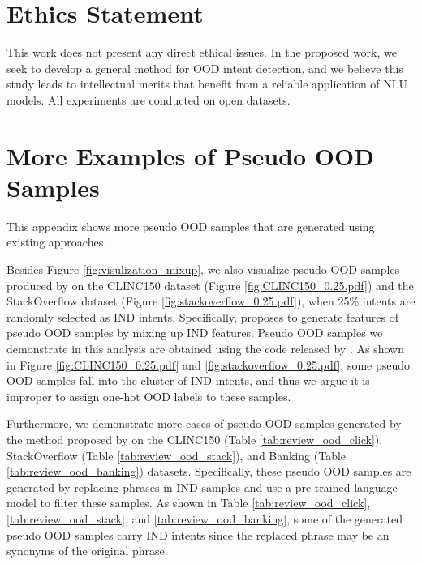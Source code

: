 \documentclass[11pt]{article}
\begin{document}
\section*{Ethics Statement}
This work does not present any direct ethical issues. In the proposed work, we seek to develop a general method for OOD intent detection, and we believe this study leads to intellectual merits that benefit from a reliable application of NLU models.  All experiments are conducted on open datasets.




\appendix

\section{More Examples of Pseudo OOD Samples}\label{append:ood_example}
This appendix shows more pseudo OOD samples that are generated using existing approaches.

Besides Figure \ref{fig:visulization_mixup}, we also visualize pseudo OOD samples produced by \citet{zhan2021out} on the CLINC150 \citep{larson2019evaluation} dataset (Figure \ref{fig:CLINC150_0.25.pdf}) and the StackOverflow \citep{xu2015short} dataset (Figure \ref{fig:stackoverflow_0.25.pdf}), when 25\% intents are randomly selected as IND intents. Specifically, \citet{zhan2021out} proposes to generate features of pseudo OOD samples by mixing up IND features. Pseudo OOD samples we demonstrate in this analysis are obtained using the code released by \citet{zhan2021out}. As shown in Figure \ref{fig:CLINC150_0.25.pdf} and \ref{fig:stackoverflow_0.25.pdf}, some pseudo OOD samples fall into the cluster of IND intents, and thus we argue it is improper to assign one-hot OOD labels to these samples.

Furthermore, we demonstrate more cases of pseudo OOD samples generated by the method proposed by \citet{shu2021odist} on the CLINC150 (Table \ref{tab:review_ood_click}), StackOverflow (Table \ref{tab:review_ood_stack}), and Banking (Table \ref{tab:review_ood_banking}) datasets. Specifically, these pseudo OOD samples are generated by replacing phrases in IND samples and use a pre-trained language model to filter these samples. As shown in Table \ref{tab:review_ood_click}, \ref{tab:review_ood_stack}, and \ref{tab:review_ood_banking}, some of the generated pseudo OOD samples carry IND intents since the replaced phrase may be an synonyms of the original phrase.
\end{document}
